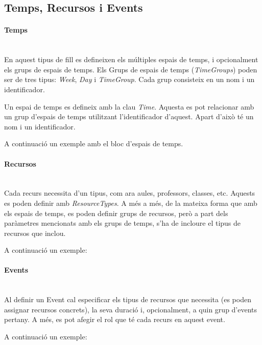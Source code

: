\documentclass[11pt,a4paper,twoside]{report}
\begin{document}
  \subsection{Temps, Recursos i Events}
  \paragraph*{Temps}~\\
  En aquest tipus de fill es defineixen els múltiples espais de temps, i opcionalment els grups de espais de temps. Els Grups de espais de temps (\textit{TimeGroups}) poden ser de tres tipus: 
  \textit{Week}, \textit{Day} i \textit{TimeGroup}. Cada grup consisteix en un nom i un identificador.
  
  Un espai de temps es defineix amb la clau \textit{Time}. Aquesta es pot relacionar amb un grup d'espais de temps utilitzant l'identificador d'aquest. Apart d'això té un nom i un identificador.

  A continuació un exemple amb el bloc d'espais de temps.

  


  \paragraph*{Recursos}~\\
  Cada recurs necessita d'un tipus, com ara aules, professors, classes, etc. Aquests es poden definir amb \textit{ResourceTypes}. A més a més, de la mateixa forma que amb els espais de temps, es poden definir grups de recursos, però a part dels paràmetres mencionats amb els grups de temps, s'ha de incloure el tipus de recursos que inclou. 

  A continuació un exemple:

  

  \paragraph*{Events}~\\
  Al definir un Event cal especificar els tipus de recursos que necessita (es poden assignar recursos concrets), la seva duració i, opcionalment, a quin grup d'events pertany. A més, es pot afegir el rol que té cada recurs en aquest event.

  A continuació un exemple:

  
\end{document}

